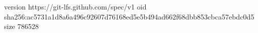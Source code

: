 version https://git-lfs.github.com/spec/v1
oid sha256:ac5731a1d8a6a496c92607d76168ed5e5b494ad662f68dbb853cbca57ebdc0d5
size 786528
